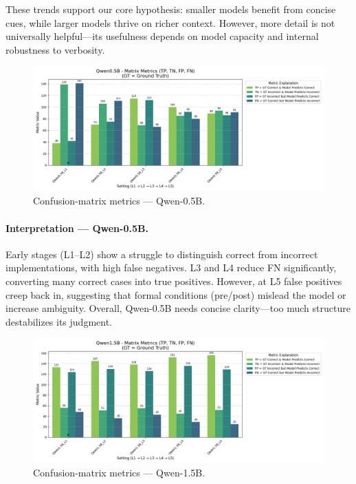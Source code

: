 \documentclass[a4paper]{usiinfbachelorproject}
\begin{document}
These trends support our core hypothesis: smaller models benefit from concise cues, while larger models thrive on richer context. However, more detail is not universally helpful—its usefulness depends on model capacity and internal robustness to verbosity.

\vspace{0.8em}

\begin{figure}[H]\centering
  \includegraphics[width=\linewidth]{figures/Qwen0.5B_matrix_metrics.png}
  \caption{Confusion-matrix metrics — Qwen-0.5B.}
  \label{fig:q05-matrix}
\end{figure}

\paragraph*{Interpretation — Qwen-0.5B.}
Early stages (L1–L2) show a struggle to distinguish correct from incorrect implementations, with high false negatives. L3 and L4 reduce FN significantly, converting many correct cases into true positives. However, at L5 false positives creep back in, suggesting that formal conditions (pre/post) mislead the model or increase ambiguity. Overall, Qwen-0.5B needs concise clarity—too much structure destabilizes its judgment.

\vspace{0.8em}

\begin{figure}[H]\centering
  \includegraphics[width=\linewidth]{figures/Qwen1.5B_matrix_metrics.png}
  \caption{Confusion-matrix metrics — Qwen-1.5B.}
  \label{fig:q15-matrix}
\end{figure}
\end{document}
